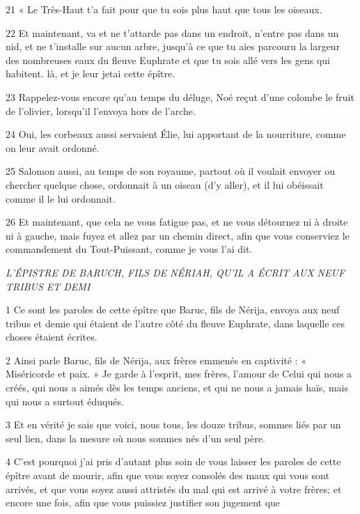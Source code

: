 \par 21 « Le Très-Haut t'a fait pour que tu sois plus haut que tous les oiseaux.

\par 22 Et maintenant, va et ne t'attarde pas dans un endroit, n'entre pas dans un nid, et ne t'installe sur aucun arbre, jusqu'à ce que tu aies parcouru la largeur des nombreuses eaux du fleuve Euphrate et que tu sois allé vers les gens qui habitent. là, et je leur jetai cette épître.

\par 23 Rappelez-vous encore qu'au temps du déluge, Noé reçut d'une colombe le fruit de l'olivier, lorsqu'il l'envoya hors de l'arche.

\par 24 Oui, les corbeaux aussi servaient Élie, lui apportant de la nourriture, comme on leur avait ordonné.

\par 25 Salomon aussi, au temps de son royaume, partout où il voulait envoyer ou chercher quelque chose, ordonnait à un oiseau (d'y aller), et il lui obéissait comme il le lui ordonnait.

\par 26 Et maintenant, que cela ne vous fatigue pas, et ne vous détournez ni à droite ni à gauche, mais fuyez et allez par un chemin direct, afin que vous conserviez le commandement du Tout-Puissant, comme je vous l'ai dit.


\par \textit{L'ÉPISTRE DE BARUCH, FILS DE NÉRIAH, QU'IL A ÉCRIT AUX NEUF TRIBUS ET DEMI}

\par 1 Ce sont les paroles de cette épître que Baruc, fils de Nérija, envoya aux neuf tribus et demie qui étaient de l'autre côté du fleuve Euphrate, dans laquelle ces choses étaient écrites.

\par 2 Ainsi parle Baruc, fils de Nérija, aux frères emmenés en captivité : « Miséricorde et paix. » Je garde à l'esprit, mes frères, l'amour de Celui qui nous a créés, qui nous a aimés dès les temps anciens, et qui ne nous a jamais haïs, mais qui nous a surtout éduqués.

\par 3 Et en vérité je sais que voici, nous tous, les douze tribus, sommes liés par un seul lien, dans la mesure où nous sommes nés d'un seul père.

\par 4 C'est pourquoi j'ai pris d'autant plus soin de vous laisser les paroles de cette épître avant de mourir, afin que vous soyez consolés des maux qui vous sont arrivés, et que vous soyez aussi attristés du mal qui est arrivé à votre frères; et encore une fois, afin que vous puissiez justifier son jugement que

